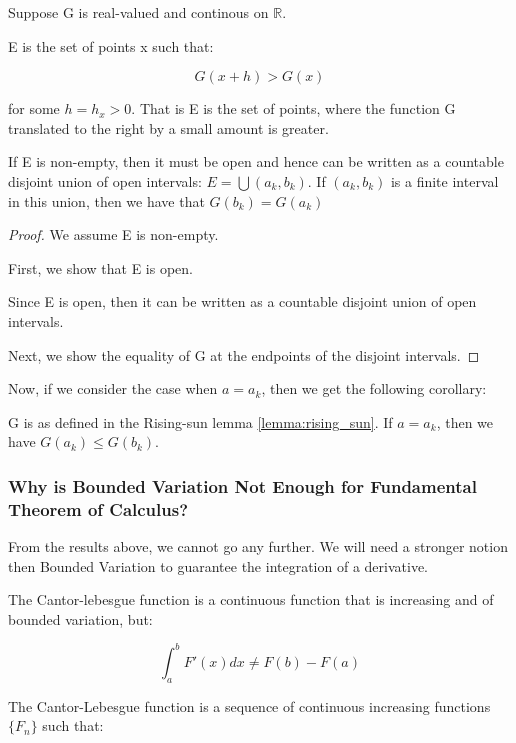 \documentclass[class=article, crop=false]{standalone}
\begin{document}
			\begin{lemma} 
			\label{lemma:rising_sun}
				Suppose G is real-valued and continous on $\mathbb{R}$. 

				E is the set of points x such that:

					$$G(x+h) > G(x)$$

				for some $h = h_x > 0$. That is E is the set of points, where the function G translated to the right by a small amount is greater.

				If E is non-empty, then it must be open and hence can be written as a countable disjoint union of open intervals: $E = \bigcup (a_k, b_k)$. If $(a_k, b_k)$ is a finite interval in this union, then we have that $G(b_k) = G(a_k)$
			\end{lemma}
			\begin{proof}
				We assume E is non-empty.

				First, we show that E is open.

				Since E is open, then it can be written as a countable disjoint union of open intervals.

				Next, we show the equality of G at the endpoints of the disjoint intervals.
			\end{proof}

			Now, if we consider the case when $a = a_k$, then we get the following corollary:

			\begin{corollary}
				G is as defined in the Rising-sun lemma \ref{lemma:rising_sun}. If $a=a_k$, then we have $G(a_k) \le G(b_k)$.
			\end{corollary}
		\subsubsection{Why is Bounded Variation Not Enough for Fundamental Theorem of Calculus?}
			From the results above, we cannot go any further. We will need a stronger notion then Bounded Variation to guarantee the integration of a derivative. 

			The Cantor-lebesgue function is a continuous function that is increasing and of bounded variation, but:

				$$\int_a^b F'(x) dx \neq F(b) - F(a)$$

			The Cantor-Lebesgue function is a sequence of continuous increasing functions $\{F_n\}$ such that:
\end{document}
